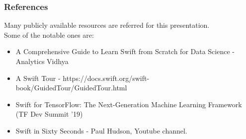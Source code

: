 \begin{frame}\frametitle{References}
Many publicly available resources are referred for this presentation. \\

\scriptsize
Some of the notable ones are:
\begin{itemize}
\item A Comprehensive Guide to Learn Swift from Scratch for Data Science - Analytics Vidhya
\item A Swift Tour - https://docs.swift.org/swift-book/GuidedTour/GuidedTour.html
\item Swift for TensorFlow: The Next-Generation Machine Learning Framework (TF Dev Summit '19)
\item Swift in Sixty Seconds - Paul Hudson, Youtube channel.
\end{itemize}
\end{frame}
